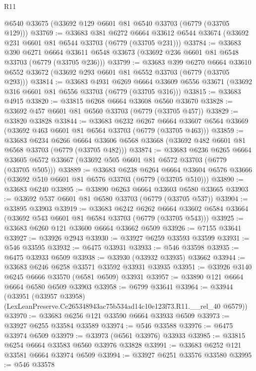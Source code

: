 \begin{lexlean}{R11}
\begin{coremodule}
    @6540
    @33675
    (@33692 @129 @6601 @81 @6540 @33703 (@6779 (@33705 @129)))
@33769 := @33683
    @381
    @6272
    @6664
    @33612
    @6544
    @33674
    (@33692 @231 @6601 @81 @6544 @33703 (@6779 (@33705 @231)))
@33784 := @33683
    @390
    @6271
    @6664
    @33611
    @6548
    @33673
    (@33692 @236 @6601 @81 @6548 @33703 (@6779 (@33705 @236)))
@33799 := @33683
    @399
    @6270
    @6664
    @33610
    @6552
    @33672
    (@33692 @293 @6601 @81 @6552 @33703 (@6779 (@33705 @293)))
@33814 := @33683
    @4931
    @6269
    @6664
    @33609
    @6556
    @33671
    (@33692 @316 @6601 @81 @6556 @33703 (@6779 (@33705 @316)))
@33815 := @33683 @4915
@33820 := @33815 @6268 @6664 @33608 @6560 @33670
@33828 := @33692 @457 @6601 @81 @6560 @33703 (@6779 (@33705 @457))
@33829 := @33820 @33828
@33844 := @33683
    @6232
    @6267
    @6664
    @33607
    @6564
    @33669
    (@33692 @463 @6601 @81 @6564 @33703 (@6779 (@33705 @463)))
@33859 := @33683
    @6234
    @6266
    @6664
    @33606
    @6568
    @33668
    (@33692 @482 @6601 @81 @6568 @33703 (@6779 (@33705 @482)))
@33874 := @33683
    @6236
    @6265
    @6664
    @33605
    @6572
    @33667
    (@33692 @505 @6601 @81 @6572 @33703 (@6779 (@33705 @505)))
@33889 := @33683
    @6238
    @6264
    @6664
    @33604
    @6576
    @33666
    (@33692 @510 @6601 @81 @6576 @33703 (@6779 (@33705 @510)))
@33890 := @33683 @6240
@33895 := @33890 @6263 @6664 @33603 @6580 @33665
@33903 := @33692 @537 @6601 @81 @6580 @33703 (@6779 (@33705 @537))
@33904 := @33895 @33903
@33919 := @33683
    @6242
    @6262
    @6664
    @33602
    @6584
    @33664
    (@33692 @543 @6601 @81 @6584 @33703 (@6779 (@33705 @543)))
@33925 := @33683 @6260 @121 @33600 @6664 @33662 @6509
@33926 := @7155 @33641
@33927 := @33926 @2943
@33930 := @33927 @6259 @33593 @33599
@33931 := @546 @33595
@33932 := @6475 @33931
@33933 := @546 @33598
@33935 := @6475 @33933 @6509
@33938 := @33930 (@33932 @33935) @33662
@33944 := @33683 @6246 @6258 @33571 @33592 @33931 @33935
@33951 := @33926 @3140 @6245 @6666 @33570 (@6581 @6509) @33931
@33957 := @33890 @121 @6664 @6664 @6580 @6509 @33903
@33958 := @6799 @33641
@33964 := @33944
    (@33951 (@33957 @33958) (LexLeanPreserve.Cc265348943ac75b534ad14c10e123f73.R11.__rel_40 @6579))
@33970 := @33683 @6256 @121 @33590 @6664 @33933 @6509
@33973 := @33927 @6255 @33584 @33589
@33974 := @546 @33588
@33976 := @6475 @33974 @6509
@33979 := @33973 (@6561 @33976) @33933
@33985 := @33815 @6254 @6664 @33583 @6560 @33976 @33828
@33991 := @33683 @6252 @121 @33581 @6664 @33974 @6509
@33994 := @33927 @6251 @33576 @33580
@33995 := @546 @33578

\end{coremodule}
\end{lexlean}

